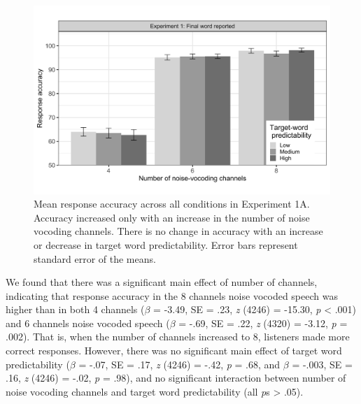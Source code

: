\documentclass[a4paper, nobind]{templates/ociamthesis}
\begin{document}
\begin{figure}

{\centering \includegraphics[width=0.95\linewidth]{figures/results-fig/expt-1a} 

}

\caption{Mean response accuracy across all conditions in Experiment 1A. Accuracy increased only with an increase in the number of noise vocoding channels. There is no change in accuracy with an increase or decrease in target word predictability. Error bars represent standard error of the means.}\label{fig:figure1a}
\end{figure}

We found that there was a significant main effect of number of channels, indicating that response accuracy in the 8 channels noise vocoded speech was higher than in both 4 channels (\(\beta\) = -3.49, SE = .23, \emph{z} (4246) = -15.30, \emph{p} \textless{} .001) and 6 channels noise vocoded speech (\(\beta\) = -.69, SE = .22, \emph{z} (4320) = -3.12, \emph{p} = .002).
That is, when the number of channels increased to 8, listeners made more correct responses.
However, there was no significant main effect of target word predictability (\(\beta\) = -.07, SE = .17, \emph{z} (4246) = -.42, \emph{p} = .68, and \(\beta\) = -.003, SE = .16, \emph{z} (4246) = -.02, \emph{p} = .98), and no significant interaction between number of noise vocoding channels and target word predictability (all \emph{p}s \textgreater{} .05).
\end{document}

